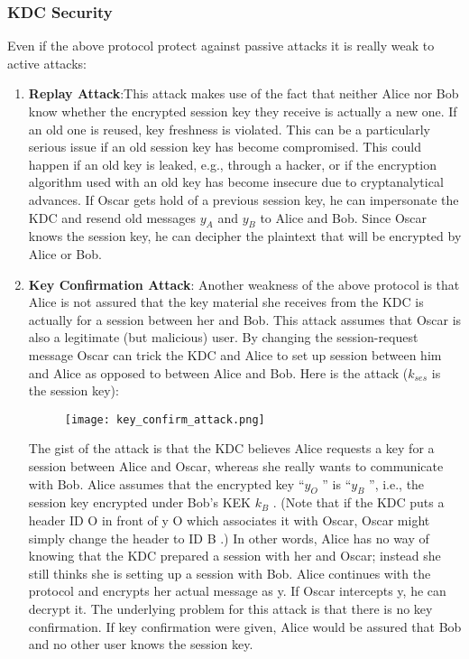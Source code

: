 \documentclass{article}
\begin{document}
\subsubsection{KDC Security}
Even if the above protocol protect against passive attacks it is really weak to active attacks:
\begin{enumerate}
    \item \textbf{Replay Attack}:This attack makes
use of the fact that neither Alice nor Bob know whether the encrypted session key
they receive is actually a new one. If an old one is reused, key freshness is violated.
This can be a particularly serious issue if an old session key has become compromised. This could happen if an old key is leaked, e.g., through a hacker, or if the
encryption algorithm used with an old key has become insecure due to cryptanalytical advances.
If Oscar gets hold of a previous session key, he can impersonate the KDC and
resend old messages $y_A$ and $y_B$ to Alice and Bob. Since Oscar knows the session
key, he can decipher the plaintext that will be encrypted by Alice or Bob.
    \item \textbf{Key Confirmation Attack}: Another weakness of the above protocol is that Alice
is not assured that the key material she receives from the KDC is actually for a
session between her and Bob. This attack assumes that Oscar is also a legitimate
(but malicious) user. By changing the session-request message Oscar can trick the
KDC and Alice to set up session between him and Alice as opposed to between
Alice and Bob. Here is the attack ($k_{ses}$ is the session key):
\begin{figure} [H]
    \centering
    \texttt{[image: key\_confirm\_attack.png]}
\end{figure}
The gist of the attack is that the KDC believes Alice requests a key for a session
between Alice and Oscar, whereas she really wants to communicate with Bob. Alice
assumes that the encrypted key “$y_O$ ” is “$y_B$ ”, i.e., the session key encrypted under
Bob’s KEK $k_B$ . (Note that if the KDC puts a header ID O in front of y O which associates it with Oscar, Oscar might simply change the header to ID B .) In other words,
Alice has no way of knowing that the KDC prepared a session with her and Oscar;
instead she still thinks she is setting up a session with Bob. Alice continues with the
protocol and encrypts her actual message as y. If Oscar intercepts y, he can decrypt
it.
The underlying problem for this attack is that there is no key confirmation. If key
confirmation were given, Alice would be assured that Bob and no other user knows
the session key.
\end{enumerate}
\end{document}
